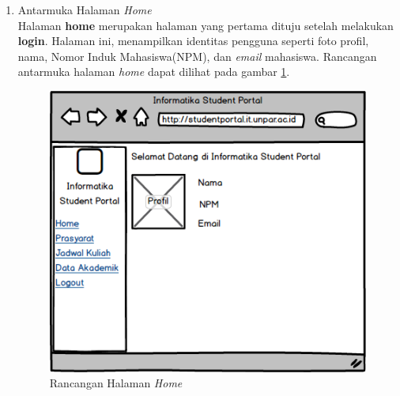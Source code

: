 \begin{enumerate}
	\item {Antarmuka Halaman \textit{Home}}\\
	Halaman \textbf{home} merupakan halaman yang pertama dituju setelah melakukan \textbf{login}. Halaman ini, menampilkan identitas pengguna seperti foto profil, nama, Nomor Induk Mahasiswa(NPM), dan \textit{email} mahasiswa. Rancangan antarmuka halaman \textit{home} dapat dilihat pada gambar \ref{fig:4_ranc_home}.
		\begin{figure}[H]
			\centering
			\includegraphics[scale=0.5]{Gambar/Home_Page}
			\caption{Rancangan Halaman \textit{Home}} 
			\label{fig:4_ranc_home}
		\end{figure}
		

\end{enumerate}
